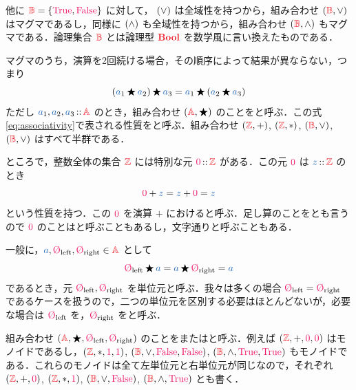 \documentclass[a5paper,twoside,fleqn,draft]{jsbook}
\begin{document}
他に $\hSet{B}=\{\hTrue,\hFalse\}$ に対して， $(\operatorname{\vee})$ は全域性を持つから，組み合わせ $\hSingleTuppleWith{\hSet{B},\hLogicalOr}$ はマグマであるし，同様に $(\operatorname{\wedge})$ も全域性を持つから，組み合わせ $\hSingleTuppleWith{\hSet{B},\hLogicalAnd}$ もマグマである．論理集合 $\hSet{B}$ とは論理型 $\hBool$ を数学風に言い換えたものである．

マグマのうち，演算を2回続ける場合，その順序によって結果が異ならない，つまり
\begin{equation}
  \label{eq:associativity}
  \left(\hVar{a}_1\hAnyBinOp \hVar{a}_2\right)\hAnyBinOp \hVar{a}_3
  =\hVar{a}_1\hAnyBinOp\left(\hVar{a}_2\hAnyBinOp{\hVar{a}_3}\right)
\end{equation}
ただし $\hVar{a}_1,\hVar{a}_2,\hVar{a}_3\hIsTypeOf\hSet{A}$ のとき，組み合わせ $\hSingleTuppleWith{\hSet{A},\hAnyBinOp}$ のことをと呼ぶ．この式\eqref{eq:associativity}で表される性質をと呼ぶ．組み合わせ $\hSingleTuppleWith{\hSet{Z},+}$, $\hSingleTuppleWith{\hSet{Z},*}$, $\hSingleTuppleWith{\hSet{B},\hLogicalOr}$, $\hSingleTuppleWith{\hSet{B},\hLogicalOr}$ はすべて半群である．

ところで，整数全体の集合 $\hSet{Z}$ には特別な元 $\hConstant{0}\hIsTypeOf\hSet{Z}$ がある．この元 $\hConstant{0}$ は $\hVar{z}\hIsTypeOf\hSet{Z}$ のとき
\begin{equation}
  \hConstant{0}+\hVar{z}
  =\hVar{z}+\hConstant{0}
  =\hVar{z}
\end{equation}
という性質を持つ．この $\hConstant{0}$ を演算 $+$ におけると呼ぶ．足し算のことをとも言うので $\hConstant{0}$ のことはと呼ぶこともあるし，文字通りと呼ぶこともある．

一般に，$\hVar{a},\mZeroLeft,\mZeroRight\in\hSet{A}$ として
\begin{equation}
  \label{eq:identity}
  \mZeroLeft\hAnyBinOp\hVar{a}
  =\hVar{a}\hAnyBinOp\mZeroRight
  =\hVar{a}
\end{equation}
であるとき，元 $\mZeroLeft,\mZeroRight$ を単位元と呼ぶ．我々は多くの場合 $\mZeroLeft=\mZeroRight$ であるケースを扱うので，二つの単位元を区別する必要はほとんどないが，必要な場合は $\mZeroLeft$ を，$\mZeroRight$ をと呼ぶ．

組み合わせ $\hSingleTuppleWith{\hSet{A},\hAnyBinOp,\mZeroLeft,\mZeroRight}$ のことをまたはと呼ぶ．例えば $\hSingleTuppleWith{\hSet{Z},+,\hConstant{0},\hConstant{0}}$ はモノイドであるし，$\hSingleTuppleWith{\hSet{Z},*,\hConstant{1},\hConstant{1}}$, $\hSingleTuppleWith{\hSet{B},\hLogicalOr,\hFalse,\hFalse}$, $\hSingleTuppleWith{\hSet{B},\hLogicalAnd,\hTrue,\hTrue}$ もモノイドである．これらのモノイドは全て左単位元と右単位元が同じなので，それぞれ $\hSingleTuppleWith{\hSet{Z},+,\hConstant{0}}$, $\hSingleTuppleWith{\hSet{Z},*,\hConstant{1}}$, $\hSingleTuppleWith{\hSet{B},\hLogicalOr,\hFalse}$, $\hSingleTuppleWith{\hSet{B},\hLogicalAnd,\hTrue}$ とも書く．
\end{document}
